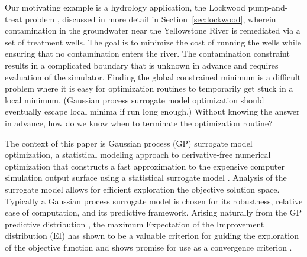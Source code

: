 \documentclass[12pt]{article}
\begin{document}
%
%

%
Our motivating example is a hydrology application, the Lockwood
pump-and-treat problem \citep{lockCite}, discussed in more detail in Section~\ref{sec:lockwood}, wherein contamination in the groundwater near the
Yellowstone River is remediated via a set of treatment wells.  
%
The goal is to minimize the cost of running the wells while ensuring that
no contamination enters the river.  
%
The contamination constraint results in a complicated boundary that is unknown in advance and
requires evaluation of the simulator. %
%
Finding the global constrained minimum is a difficult problem where it is easy for
optimization routines to temporarily get stuck in a local
minimum. (Gaussian process surrogate model optimization should eventually escape local minima if run long enough.)  
%
Without knowing the answer in advance, how do we know when
to terminate the optimization routine?


%
%

The context of this paper is Gaussian process (GP) surrogate model
optimization, a statistical modeling approach to derivative-free
numerical optimization that constructs a fast approximation to
the expensive computer simulation output surface using a statistical surrogate model \citep{santnerBook}.
%
Analysis of the surrogate model allows for efficient exploration the objective solution space.  
%
Typically a Gaussian process surrogate model is chosen for its
robustness, relative ease of computation, and its predictive framework.
Arising naturally from the GP predictive distribution \citep{gBook}, the maximum Expectation of the Improvement distribution (EI) has shown to be a valuable criterion for guiding the exploration of the objective function and shows promise for use as a convergence criterion \citep{jonesEIOpt, taddyOpt}. %
%
\end{document}
